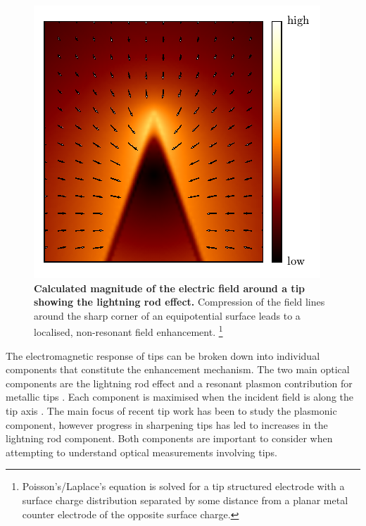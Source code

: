 \documentclass{article}
\begin{document}
\begin{figure}
\centering
\vspace{-15pt}
\includegraphics[width=\textwidth]{figures/lightning_rod_effect}
\vspace{-25pt}
\caption[Calculated magnitude of the electric field around a tip showing the lightning rod effect]{\textbf{Calculated magnitude of the electric field around a tip showing the lightning rod effect.} Compression of the field lines around the sharp corner of an equipotential surface leads to a localised, non-resonant field enhancement.%
\footnote{Poisson's/Laplace's equation is solved for a tip structured electrode with a surface charge distribution separated by some distance from a planar metal counter electrode of the opposite surface charge.}}
\label{fig:lightning_rod_effect}
\end{figure}

The electromagnetic response of tips can be broken down into individual components that constitute the enhancement mechanism. The two main optical components are the lightning rod effect and a resonant plasmon contribution for metallic tips \cite{esteban2006, zhang2009, schmid2013}. Each component is maximised when the incident field is along the tip axis \cite{zhang2014}. The main focus of recent tip work has been to study the plasmonic component, however progress in sharpening tips has led to increases in the lightning rod component. Both components are important to consider when attempting to understand optical measurements involving tips.
\end{document}
